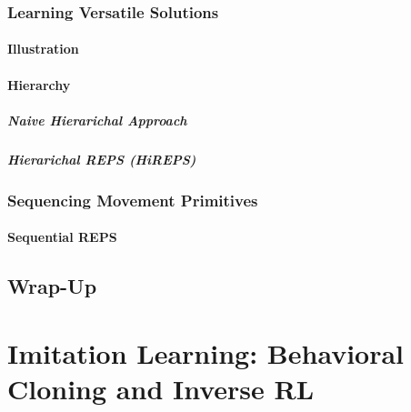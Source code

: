 		\subsection{Learning Versatile Solutions} %

			\subsubsection{Illustration} %

			\subsubsection{Hierarchy} %

				\paragraph{Naive Hierarichal Approach} %

				\paragraph{Hierarichal REPS (HiREPS)} %

		\subsection{Sequencing Movement Primitives} %

			\subsubsection{Sequential REPS} %

	\section{Wrap-Up} %

\chapter{Imitation Learning: Behavioral Cloning and Inverse RL} %


